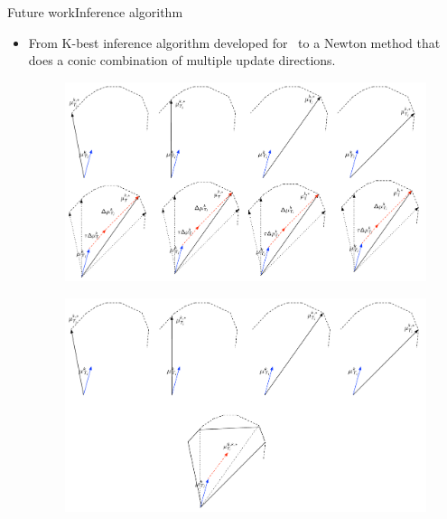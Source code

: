 \documentclass[first=dgreen,second=purple,logo=yellowexc]{aaltoslides}
\begin{document}
%
\begin{frame}{Future work}{Inference algorithm}
	\begin{itemize}\footnotesize
		\item From K-best inference algorithm developed for \rta\ to a Newton method that does a conic combination of multiple update directions.
		\only<1>
		{\begin{figure}
			\begin{center}
				\includegraphics[scale=0.25]{./best_update.pdf}
			\end{center}
		\end{figure}}
		{\begin{figure}
			\begin{center}
				\includegraphics[scale=0.25]{./multiple_update.pdf}
			\end{center}
		\end{figure}}
	\end{itemize}
\end{frame}
\end{document}
